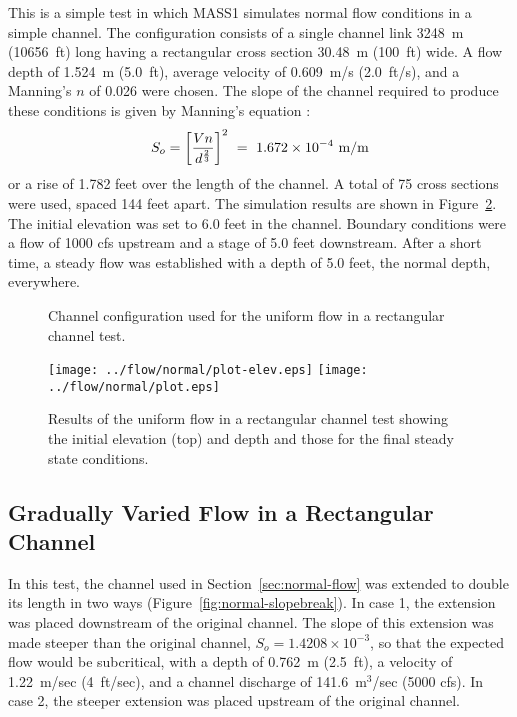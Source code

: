 \documentclass[12pt,dvips,letterpaper]{article}
\begin{document}
This is a simple test in which MASS1 simulates normal flow conditions
in a simple channel.  The configuration consists of a single channel
link 3248~m (10656~ft) long having a rectangular cross section 30.48~m
(100~ft) wide.  A flow depth of 1.524~m (5.0~ft), average velocity of
0.609~m/s (2.0~ft/s), and a Manning's $n$ of 0.026 were chosen.  The
slope of the channel required to produce these conditions is given by
Manning's equation \citep{Chow59}:
\begin{displaymath}
  S_{o} = \left[ { V n } \over { d^{2 \over 3} } \right]^{2} ~ 
  = ~ 1.672 \times 10^{-4} ~ \textrm{m} \slash \textrm{m}
\end{displaymath}
or a rise of 1.782 feet over the length of the channel.  A total of 75
cross sections were used, spaced 144 feet apart. The simulation
results are shown in Figure~\ref{fig:normal-flow-results}.  The
initial elevation was set to 6.0 feet in the channel.  Boundary
conditions were a flow of 1000 cfs upstream and a stage of 5.0 feet
downstream. After a short time, a steady flow was established with a
depth of 5.0 feet, the normal depth, everywhere.

\begin{figure}[htbp]
  \begin{center}
    
    \caption{Channel configuration used for the uniform flow in a
      rectangular channel test.}
    \label{fig:normal-flow-channel}
  \end{center}
\end{figure}
\begin{figure}[htbp]
  \centering
  \texttt{[image: ../flow/normal/plot-elev.eps]}
  \texttt{[image: ../flow/normal/plot.eps]}
  \caption{Results of the uniform flow in a rectangular channel test
    showing the initial elevation (top) and depth and those for the
    final steady state conditions.}
  \label{fig:normal-flow-results}
\end{figure}

\subsection{Gradually Varied Flow in a Rectangular Channel}
\label{sec:subcr-norm-flow}

In this test, the channel used in Section~\ref{sec:normal-flow} was
extended to double its length in two ways
(Figure~\ref{fig:normal-slopebreak}).  In case 1, the extension was
placed downstream of the original channel.  The slope of this
extension was made steeper than the original channel, $S_{o} = 1.4208
\times 10^{-3}$, so that the expected flow would be subcritical, with a
depth of 0.762~m (2.5~ft), a velocity of 1.22~m/sec (4~ft/sec), and
a channel discharge of 141.6~m$^{3}$/sec (5000 cfs).  In case 2, the
steeper extension was placed upstream of the original channel.
\end{document}
